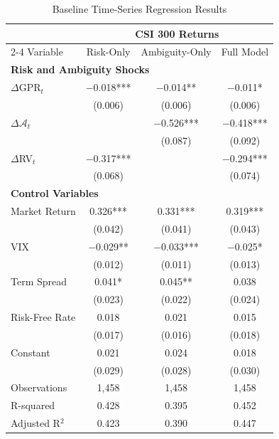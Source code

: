 \documentclass[preprint,12pt,authoryear]{elsarticle}
\begin{document}
\clearpage
\begin{table}[htbp]
\centering
\caption{Baseline Time-Series Regression Results}
\label{tab:baseline_ts}
\begin{threeparttable}
\begin{tabular*}{\textwidth}{@{\extracolsep{\fill}} lccc @{\extracolsep{\fill}}}
\toprule
& \multicolumn{3}{c}{CSI 300 Returns} \\
\cmidrule(lr){2-4}
Variable & Risk-Only & Ambiguity-Only & Full Model \\
\midrule
\midrule
\multicolumn{4}{l}{\textbf{Risk and Ambiguity Shocks}} \\
$\Delta$GPR$_t$ & $-$0.018*** & $-$0.014** & $-$0.011* \\
& (0.006) & (0.006) & (0.006) \\
$\Delta \mathcal{A}_{t}$ &  & $-$0.526*** & $-$0.418*** \\
&  & (0.087) & (0.092) \\
$\Delta$RV$_t$ & $-$0.317*** &  & $-$0.294*** \\
& (0.068) &   & (0.074) \\
\midrule
\multicolumn{4}{l}{\textbf{Control Variables}} \\
Market Return & 0.326*** & 0.331*** & 0.319*** \\
& (0.042) & (0.041) & (0.043) \\
VIX & $-$0.029** & $-$0.033*** & $-$0.025* \\
& (0.012) & (0.011) & (0.013) \\
Term Spread & 0.041* & 0.045** & 0.038 \\
& (0.023) & (0.022) & (0.024) \\
Risk-Free Rate & 0.018 & 0.021 & 0.015 \\
& (0.017) & (0.016) & (0.018) \\
\midrule
Constant & 0.021 & 0.024 & 0.018 \\
& (0.029) & (0.028) & (0.030) \\
\midrule
Observations & 1,458 & 1,458 & 1,458 \\
R-squared & 0.428 & 0.395 & 0.452 \\
Adjusted R$^2$ & 0.423 & 0.390 & 0.447 \\
\bottomrule
\end{tabular*}
\begin{tablenotes}[flushleft]
\small

\end{tablenotes}
\end{threeparttable}
\end{table}
\end{document}
